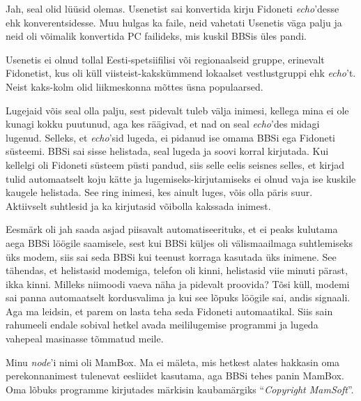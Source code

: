 
Jah, seal olid lüüsid olemas. Usenetist sai konvertida kirju Fidoneti 
\emph{echo}'desse ehk konverentsidesse. Muu hulgas ka faile, neid vahetati
Usenetis väga palju ja neid oli võimalik konvertida 
PC failideks, mis kuskil BBSis üles pandi.


Usenetis ei olnud tollal Eesti-spetsiifilisi või 
regionaalseid gruppe, erinevalt Fidonetist, kus oli küll viisteist-kakskümmend lokaalset vestlustgruppi ehk \emph{echo}'t. 
Neist kaks-kolm olid liikmeskonna mõttes üsna populaarsed.


Lugejaid võis seal olla palju, sest pidevalt tuleb välja 
inimesi, kellega mina ei ole kunagi kokku puutunud, 
aga kes räägivad, et nad on seal \emph{echo}'des midagi lugenud. Selleks, et \emph{echo}'sid lugeda, ei pidanud ise
omama BBSi ega Fidoneti süsteemi. BBSi sai sisse helistada, seal lugeda ja soovi korral kirjutada. Kui kellelgi oli Fidoneti süsteem 
püsti pandud, siis selle eelis seisnes selles, et kirjad tulid 
automaatselt koju kätte ja lugemiseks-kirjutamiseks ei olnud vaja ise kuskile 
kaugele helistada. See ring inimesi, kes ainult luges, 
võis olla päris suur. Aktiivselt suhtlesid ja ka kirjutasid 
võibolla kakssada inimest.


Eesmärk oli jah saada asjad piisavalt automatiseerituks, et 
ei peaks kulutama aega 
BBSi löögile saamisele, sest kui BBSi küljes oli 
välismaailmaga suhtlemiseks üks modem, siis sai 
seda BBSi kui teenust korraga kasutada üks inimene. 
See tähendas, et helistasid modemiga, telefon oli kinni, helistasid viie minuti 
pärast, ikka kinni. Milleks niimoodi vaeva näha ja pidevalt 
proovida? Tõsi küll, modemi sai panna automaatselt kordusvalima 
ja kui see lõpuks löögile sai, andis signaali. Aga ma leidsin, et parem on lasta teha
seda Fidoneti automaatikal. Siis sain rahumeeli endale sobival hetkel avada meililugemise programmi ja lugeda vahepeal masinasse tõmmatud meile. 


Minu \emph{node}'i nimi oli MamBox. Ma ei mäleta, mis hetkest alates hakkasin oma perekonnanimest tulenevat eesliidet kasutama, aga BBSi tehes panin MamBox. 
Oma lõbuks programme kirjutades märkisin kaubamärgiks
\enquote{\emph{Copyright MamSoft}}.

